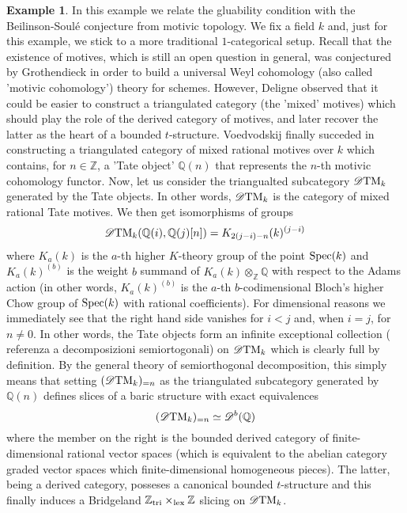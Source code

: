 \documentclass{article}
\theoremstyle{definition}
\newtheorem{exmp}[thm]{Example}
\newcommand{\Z}{\mathbb{Z}}
\newcommand{\lex}{\times_{\textnormal{lex}}}
\newcommand{\triv}{\mathbb{Z}_{\textnormal{tri}}}
\begin{document}
\begin{exmp}
  In this example we relate the gluability condition with the Beilinson-Soul\'e conjecture from motivic topology. We fix a field $k$ and, just for this example, we stick to a more traditional $1$-categorical setup. Recall that the existence of motives, which is still an open question in general, was conjectured by Grothendieck in order to build a universal Weyl cohomology (also called 'motivic cohomology') theory for schemes. However, Deligne observed that it could be easier to construct a triangulated category (the 'mixed' motives) which should play the role of the derived category of motives, and later recover the latter as the heart of a bounded $t$-structure. Voedvodskij finally succeded in constructing a triangulated category of mixed rational motives over $k$ which contains, for $n \in \Z$, a 'Tate object' $\mathbb{Q}(n)$ that represents the $n$-th motivic cohomology functor. Now, let us consider the triangualted subcategory $\mathscr{D}\textnormal{TM}_k$ generated by the Tate objects. In other words, $\mathscr{D}\textnormal{TM}_k$ is the category of mixed rational Tate motives. We then get isomorphisms of groups
  \[
   \mathscr{D}\textnormal{TM}_k(\mathbb{Q}(i),\mathbb{Q}(j)[n])=K_{2(j-i)-n}(k)^{(j-i)}
   \]
   where $K_a(k)$ is the $a$-th higher $K$-theory group of the point $\textnormal{Spec}(k)$ and $K_a(k)^{(b)}$ is the weight $b$ summand of $K_a(k) \otimes_{\mathbb{Z}} \mathbb{Q}$ with respect to the Adams action (in other words, $K_a(k)^{(b)}$ is the $a$-th $b$-codimensional Bloch's higher Chow group of $\textnormal{Spec}(k)$ with rational coefficients). For dimensional reasons we immediately see that the right hand side vanishes for $i < j$ and, when $i = j$, for $n \neq 0$. In other words, the Tate objects form an infinite exceptional collection ({\color{red} referenza a decomposizioni semiortogonali}) on $\mathscr{D}\textnormal{TM}_k$ which is clearly full by definition. By the general theory of semiorthogonal decomposition, this simply means that setting $(\mathscr{D}\textnormal{TM}_k)_{=n}$ as the triangulated subcategory generated by $\mathbb{Q}(n)$ defines slices of a baric structure with exact equivalences
   \[
   (\mathscr{D}\textnormal{TM}_k)_{=n} \simeq \mathscr{D}^b(\mathbb{Q})
   \]
   where the member on the right is the bounded derived category of finite-dimensional rational vector spaces (which is equivalent to the abelian category graded vector spaces which finite-dimensional homogeneous pieces). The latter, being a derived category, posseses a canonical bounded $t$-structure and this finally induces a Bridgeland $\triv \lex \Z$ slicing on $\mathscr{D}\textnormal{TM}_k$. \\

\end{exmp}
\end{document}
